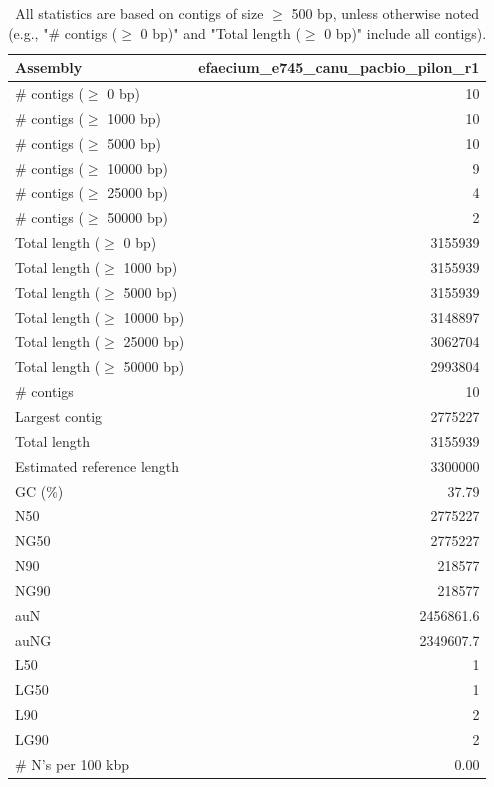 \documentclass[12pt,a4paper]{article}
\begin{document}
\begin{table}[ht]
\begin{center}
\caption{All statistics are based on contigs of size $\geq$ 500 bp, unless otherwise noted (e.g., "\# contigs ($\geq$ 0 bp)" and "Total length ($\geq$ 0 bp)" include all contigs).}
\begin{tabular}{|l*{1}{|r}|}
\hline
Assembly & efaecium\_e745\_canu\_pacbio\_pilon\_r1 \\ \hline
\# contigs ($\geq$ 0 bp) & 10 \\ \hline
\# contigs ($\geq$ 1000 bp) & 10 \\ \hline
\# contigs ($\geq$ 5000 bp) & 10 \\ \hline
\# contigs ($\geq$ 10000 bp) & 9 \\ \hline
\# contigs ($\geq$ 25000 bp) & 4 \\ \hline
\# contigs ($\geq$ 50000 bp) & 2 \\ \hline
Total length ($\geq$ 0 bp) & 3155939 \\ \hline
Total length ($\geq$ 1000 bp) & 3155939 \\ \hline
Total length ($\geq$ 5000 bp) & 3155939 \\ \hline
Total length ($\geq$ 10000 bp) & 3148897 \\ \hline
Total length ($\geq$ 25000 bp) & 3062704 \\ \hline
Total length ($\geq$ 50000 bp) & 2993804 \\ \hline
\# contigs & 10 \\ \hline
Largest contig & 2775227 \\ \hline
Total length & 3155939 \\ \hline
Estimated reference length & 3300000 \\ \hline
GC (\%) & 37.79 \\ \hline
N50 & 2775227 \\ \hline
NG50 & 2775227 \\ \hline
N90 & 218577 \\ \hline
NG90 & 218577 \\ \hline
auN & 2456861.6 \\ \hline
auNG & 2349607.7 \\ \hline
L50 & 1 \\ \hline
LG50 & 1 \\ \hline
L90 & 2 \\ \hline
LG90 & 2 \\ \hline
\# N's per 100 kbp & 0.00 \\ \hline
\end{tabular}
\end{center}
\end{table}
\end{document}
